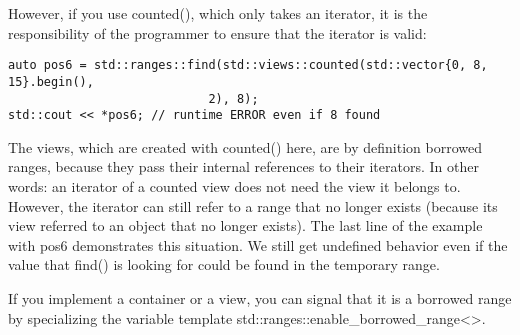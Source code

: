 \begin{itemize}
However, if you use counted(), which only takes an iterator, it is the responsibility of the programmer to ensure that the iterator is valid:

\begin{lstlisting}[style=styleCXX]
auto pos6 = std::ranges::find(std::views::counted(std::vector{0, 8, 15}.begin(),
							2), 8);
std::cout << *pos6; // runtime ERROR even if 8 found
\end{lstlisting}

The views, which are created with counted() here, are by definition borrowed ranges, because they pass their internal references to their iterators. In other words: an iterator of a counted view does not need the view it belongs to. However, the iterator can still refer to a range that no longer exists (because its view referred to an object that no longer exists). The last line of the example with pos6 demonstrates this situation. We still get undefined behavior even if the value that find() is looking for could be found in the temporary range.

\end{itemize}

If you implement a container or a view, you can signal that it is a borrowed range by specializing the variable template std::ranges::enable\_borrowed\_range<>.








